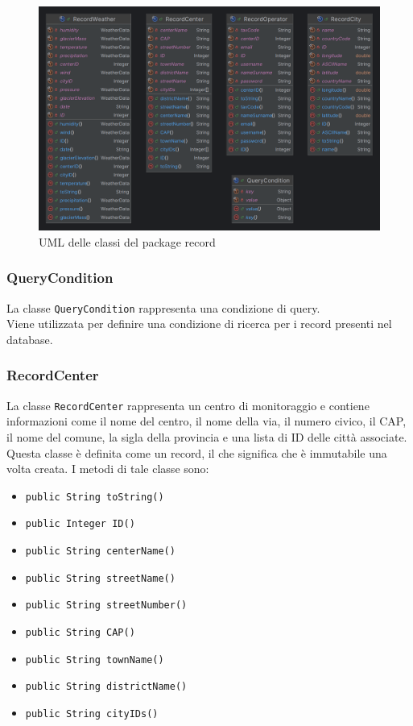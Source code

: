 \begin{figure}[H]
    \centering
    \includegraphics[scale = 0.2]{img/recordPackage.png}
    \caption{UML delle classi del package record}
    \label{fig:Record}
\end{figure}
\subsubsection{QueryCondition}
La classe \texttt{QueryCondition} rappresenta una condizione di query.\\
Viene utilizzata per definire una condizione di ricerca per i record presenti nel database.\\

\subsubsection{RecordCenter}
La classe \texttt{RecordCenter} rappresenta un centro di monitoraggio e contiene informazioni come il nome del centro, il nome della via, il numero civico, il CAP, il nome del comune, la sigla della provincia e una lista di ID delle città associate.
Questa classe è definita come un record, il che significa che è immutabile una volta creata.
I metodi di tale classe sono:
\begin{itemize}
    \item \texttt{public String toString()}
    \item \texttt{public Integer ID()}
    \item \texttt{public String centerName()}
    \item \texttt{public String streetName()}
    \item \texttt{public String streetNumber()}
    \item \texttt{public String CAP()}
    \item \texttt{public String townName()}
    \item \texttt{public String districtName()}
    \item \texttt{public String cityIDs()}
\end{itemize}

